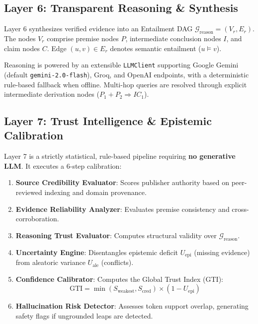\documentclass[journal,compsoc]{IEEEtran}
\begin{document}
\subsection{Layer 6: Transparent Reasoning \& Synthesis}
Layer 6 synthesizes verified evidence into an Entailment DAG $\mathcal{G}_{\text{reason}} = (V_r, E_r)$. The nodes $V_r$ comprise premise nodes $P$, intermediate conclusion nodes $I$, and claim nodes $C$. Edge $(u, v) \in E_r$ denotes semantic entailment ($u \models v$). 

Reasoning is powered by an extensible \texttt{LLMClient} supporting Google Gemini (default \texttt{gemini-2.0-flash}), Groq, and OpenAI endpoints, with a deterministic rule-based fallback when offline. Multi-hop queries are resolved through explicit intermediate derivation nodes ($P_1 + P_2 \Rightarrow IC_1$).

\subsection{Layer 7: Trust Intelligence \& Epistemic Calibration}
Layer 7 is a strictly statistical, rule-based pipeline requiring \textbf{no generative LLM}. It executes a 6-step calibration:
\begin{enumerate}
    \item \textbf{Source Credibility Evaluator}: Scores publisher authority based on peer-reviewed indexing and domain provenance.
    \item \textbf{Evidence Reliability Analyzer}: Evaluates premise consistency and cross-corroboration.
    \item \textbf{Reasoning Trust Evaluator}: Computes structural validity over $\mathcal{G}_{\text{reason}}$.
    \item \textbf{Uncertainty Engine}: Disentangles epistemic deficit $U_{\text{epi}}$ (missing evidence) from aleatoric variance $U_{\text{ale}}$ (conflicts).
    \item \textbf{Confidence Calibrator}: Computes the Global Trust Index (GTI):
    \begin{equation}
    \text{GTI} = \min(S_{\text{weakest}}, S_{\text{cred}}) \times (1 - U_{\text{epi}})
    \end{equation}
    \item \textbf{Hallucination Risk Detector}: Assesses token support overlap, generating safety flags if ungrounded leaps are detected.
\end{enumerate}
\end{document}
